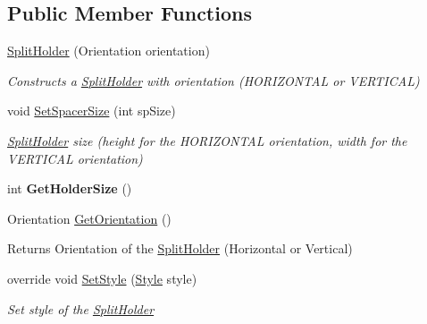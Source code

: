 \subsection*{Public Member Functions}
\begin{DoxyCompactItemize}
\item 
\mbox{\hyperlink{class_space_v_i_l_1_1_split_holder_ae6b6eb9d5aaec2d342060ff43161c828}{Split\+Holder}} (Orientation orientation)
\begin{DoxyCompactList}\small\item\em Constructs a \mbox{\hyperlink{class_space_v_i_l_1_1_split_holder}{Split\+Holder}} with orientation (H\+O\+R\+I\+Z\+O\+N\+T\+AL or V\+E\+R\+T\+I\+C\+AL) \end{DoxyCompactList}\item 
void \mbox{\hyperlink{class_space_v_i_l_1_1_split_holder_a62cde28681c0be51120e07724db4486b}{Set\+Spacer\+Size}} (int sp\+Size)
\begin{DoxyCompactList}\small\item\em \mbox{\hyperlink{class_space_v_i_l_1_1_split_holder}{Split\+Holder}} size (height for the H\+O\+R\+I\+Z\+O\+N\+T\+AL orientation, width for the V\+E\+R\+T\+I\+C\+AL orientation) \end{DoxyCompactList}\item 
\mbox{\label{class_space_v_i_l_1_1_split_holder_a023beddef2f5f0a94acb8848863df67a}} 
int {\bfseries Get\+Holder\+Size} ()
\item 
\mbox{\label{class_space_v_i_l_1_1_split_holder_ab6bd818ebb9c04889fd9e5e18262015c}} 
Orientation \mbox{\hyperlink{class_space_v_i_l_1_1_split_holder_ab6bd818ebb9c04889fd9e5e18262015c}{Get\+Orientation}} ()
\begin{DoxyCompactList}\small\item\em \begin{DoxyReturn}{Returns}
Orientation of the \mbox{\hyperlink{class_space_v_i_l_1_1_split_holder}{Split\+Holder}} (Horizontal or Vertical) 
\end{DoxyReturn}
\end{DoxyCompactList}\item 
override void \mbox{\hyperlink{class_space_v_i_l_1_1_split_holder_a0489f7db33f2310761600b11ea308c40}{Set\+Style}} (\mbox{\hyperlink{class_space_v_i_l_1_1_decorations_1_1_style}{Style}} style)
\begin{DoxyCompactList}\small\item\em Set style of the \mbox{\hyperlink{class_space_v_i_l_1_1_split_holder}{Split\+Holder}} \end{DoxyCompactList}\end{DoxyCompactItemize}
